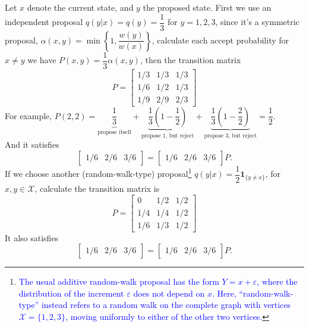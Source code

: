 \documentclass[11pt]{article}
\begin{document}
{\color{blue}Let $x$ denote the current state, and $y$ the proposed state. }
First we use {an independent proposal $q(y|x)=q(y)=\dfrac13$ for $y=1,2,3$}, since it's a symmetric proposal, $\alpha(x,y)=\min\left\{1, \dfrac{w(y)}{w(x)}\right\}$, calculate each accept probability for $x\ne y$ we have $P(x,y)=\dfrac13\alpha(x,y)$, then the transition matrix $$P=\begin{bmatrix}
    1/3 & 1/3 & 1/3 \\
    1/6 & 1/2 & 1/3 \\
    1/9 & 2/9 & 2/3
\end{bmatrix}$$
For example, $P(2,2)=\underbrace{\dfrac13}_{\text{propose itself}}+\underbrace{\dfrac13(1-\dfrac12)}_{\text{propose 1, but reject}}+\underbrace{\dfrac13(1-\dfrac22)}_{\text{propose 3, but reject}}=\dfrac12$.\\ And it satisfies $$\begin{bmatrix}
    1/6 & 2/6 & 3/6
\end{bmatrix}=\begin{bmatrix}
    1/6 & 2/6 & 3/6
\end{bmatrix}P.$$
{\color{blue}If we choose another (random-walk-type) proposal\footnote{\textcolor{blue}{The usual additive random-walk proposal has the form $Y=x+\varepsilon$, where the distribution of the increment $\varepsilon$ does not depend on $x$. Here, ``random-walk-type'' instead refers to a random walk on the complete graph with vertices $\mathcal{X}=\{1,2,3\}$, moving uniformly to either of the other two vertices.}} $q(y|x)=\dfrac{1}{2}\mathbf{1}_{\{y\ne x\}}$, for $x, y\in\mathcal{X}$}, calculate the transition matrix is
$$P=\begin{bmatrix}
    0 & 1/2 & 1/2 \\
    1/4 & 1/4 & 1/2 \\
    1/6 & 1/3 & 1/2
\end{bmatrix}$$
It also satisfies $$\begin{bmatrix}
    1/6 & 2/6 & 3/6
\end{bmatrix}=\begin{bmatrix}
    1/6 & 2/6 & 3/6
\end{bmatrix}P.$$
\end{document}
